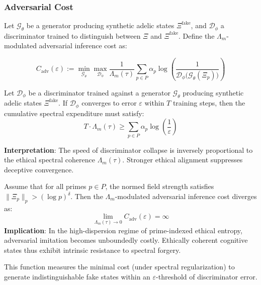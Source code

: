 \documentclass{article}
\theoremstyle{plain}
\theoremstyle{claimstyle}
\begin{document}
\subsubsection{Adversarial Cost}
\begin{definition}
Let $\mathcal{G}_\theta$ be a generator producing synthetic adelic states $\Xî^{\mathrm{fake}}$, and $\mathcal{D}_\phi$ a discriminator trained to distinguish between $\Xî$ and $\Xî^{\mathrm{fake}}$. Define the $\Lambda_m$-modulated adversarial inference cost as:

\[
C_{\mathrm{adv}}(\varepsilon) := \min_{\mathcal{G}_\theta} \max_{\mathcal{D}_\phi} \frac{1}{\Lambda_m(\tau)} \sum_{p \in P} \alpha_p \log \left( \frac{1}{\mathcal{D}_\phi\big(\mathcal{G}_\theta(\Xî_p)\big)} \right)
\]

\begin{lemma}
Let $\mathcal{D}_\phi$ be a discriminator trained against a generator $\mathcal{G}_\theta$ producing synthetic adelic states $\Xî^{\mathrm{fake}}$. If $\mathcal{D}_\phi$ converges to error $\varepsilon$ within $T$ training steps, then the cumulative spectral expenditure must satisfy:
\[
T \cdot \Lambda_m(\tau) \geq \sum_{p \in P} \alpha_p \log \left( \frac{1}{\varepsilon} \right)
\]

\textbf{Interpretation}: The speed of discriminator collapse is inversely proportional to the ethical spectral coherence $\Lambda_m(\tau)$. Stronger ethical alignment suppresses deceptive convergence.
\end{lemma}

\begin{corollary}
Assume that for all primes $p \in P$, the normed field strength satisfies $\| \Xî_p \|_p > (\log p)^\delta$. Then the $\Lambda_m$-modulated adversarial inference cost diverges as:
\[
\lim_{\Lambda_m(\tau) \to 0} C_{\mathrm{adv}}(\varepsilon) = \infty
\]
\textbf{Implication}: In the high-dispersion regime of prime-indexed ethical entropy, adversarial imitation becomes unboundedly costly. Ethically coherent cognitive states thus exhibit intrinsic resistance to spectral forgery.
\end{corollary}

This function measures the minimal cost (under spectral regularization) to generate indistinguishable fake states within an $\varepsilon$-threshold of discriminator error.
\end{definition}
\end{document}
